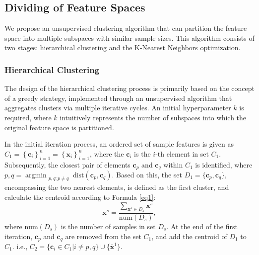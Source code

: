 \documentclass[final,3p,times]{elsarticle}
\begin{document}
\subsection{Dividing of Feature Spaces}
We propose an unsupervised clustering algorithm that can 
partition the feature space into multiple subspaces with 
similar sample sizes. This algorithm consists of two stages: 
hierarchical clustering and the K-Nearest Neighbors 
optimization.

\subsubsection{Hierarchical Clustering}
The design of the hierarchical clustering process is 
primarily based on the concept of a greedy strategy, 
implemented through an unsupervised algorithm that 
aggregates clusters via multiple iterative cycles. 
An initial hyperparameter $k$ is required, where $k$ 
intuitively represents the number of subspaces into which 
the original feature space is partitioned. 

In the initial iteration process, an ordered set of sample 
features is given as $C_1=\left\{\boldsymbol{c}_i \right\}_{i=1}^n
=\left\{\boldsymbol{x}_i \right\}_{i=1}^n$, where the 
$\boldsymbol{c}_i$ is the $i\text{-th}$ element in set 
$C_1$. Subsequently, the closest pair of elements 
$\boldsymbol{c}_p$ and $\boldsymbol{c}_q$ within $C_1$ is 
identified, where $p,q=\mathop{\text{argmin}}_{\substack{p, q; p\neq {q}}} 
\text{dist}(\boldsymbol{c}_p,\boldsymbol{c}_q)$. Based on this, 
the set $D_{1}=\{\boldsymbol{c}_p,\boldsymbol{c}_q\}$, 
encompassing the two nearest elements, is defined as the first 
cluster, and calculate the centroid according to Formula \eqref{eq1}:
\begin{equation}
\label{eq1}
\bar{\boldsymbol{x}}^s = \frac{\sum_{\boldsymbol{x}^s \in D_s} 
\boldsymbol{x}^s}{\text{num}(D_s)}, 
\end{equation}
where $\text{num}(D_s)$ is the number of samples in set $D_s$. At 
the end of the first iteration, $\boldsymbol{c}_p$ and $\boldsymbol{c}_q$ are removed from the set $C_1$, and add the 
centroid of $D_1$ to $C_1$. i.e., $C_{2}=\{\boldsymbol{c}_i \in C_{1} | i \neq 
p, q\} \cup \{\bar{\boldsymbol{x}}^1\}$.
\end{document}
